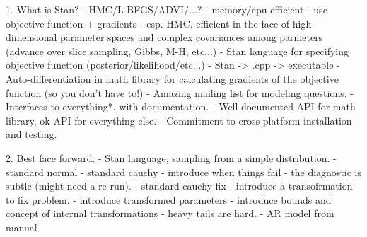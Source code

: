 


1. What is Stan?
 - HMC/L-BFGS/ADVI/...? 
   - memory/cpu efficient
	 - use objective function + gradients
	 - esp. HMC, efficient in the face of high-dimensional parameter spaces and 
	   complex covariances among parmeters (advance over slice sampling, 
		 Gibbs, M-H, etc...)
 - Stan language for specifying objective function (posterior/likelihood/etc...)
   - Stan -> .cpp -> executable
 - Auto-differentiation in math library for calculating gradients of the 
     objective function (so you don't have to!)
 - Amazing mailing list for modeling questions.
 - Interfaces to everything*, with documentation.
 - Well documented API for math library, ok API for everything else.
 - Commitment to cross-platform installation and testing.

2. Best face forward.
 - Stan language, sampling from a simple distribution.
   - standard normal
	 - standard cauchy       
	   - introduce when things fail
		 - the diagnostic is subtle (might need a re-run).
	 - standard cauchy fix   
	   - introduce a transofrmation to fix problem.
		 - introduce transformed parameters
		 - introduce bounds and concept of internal transformations
		 - heavy tails are hard.
	- AR model from manual
















